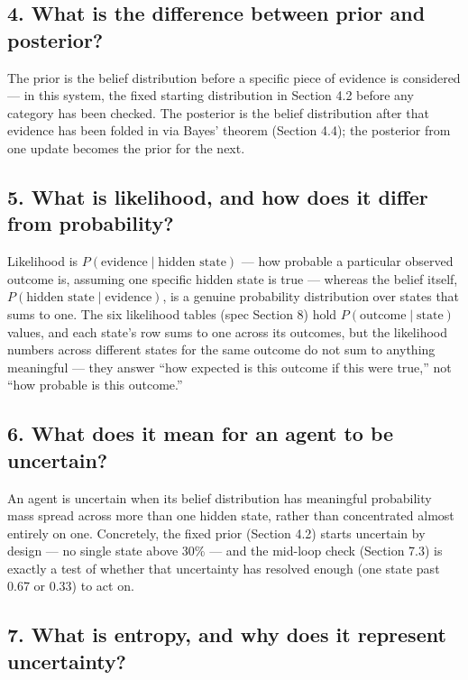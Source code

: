 \documentclass[11pt]{article}
\begin{document}
\subsection*{4. What is the difference between prior and posterior?}

The prior is the belief distribution before a specific piece of evidence is considered --- in this system, the fixed starting distribution in Section 4.2 before any category has been checked. The posterior is the belief distribution after that evidence has been folded in via Bayes' theorem (Section 4.4); the posterior from one update becomes the prior for the next.

\subsection*{5. What is likelihood, and how does it differ from probability?}

Likelihood is $P(\text{evidence}\mid\text{hidden state})$ --- how probable a particular observed outcome is, assuming one specific hidden state is true --- whereas the belief itself, $P(\text{hidden state}\mid\text{evidence})$, is a genuine probability distribution over states that sums to one. The six likelihood tables (spec Section 8) hold $P(\text{outcome}\mid\text{state})$ values, and each state's row sums to one across its outcomes, but the likelihood numbers across different states for the same outcome do not sum to anything meaningful --- they answer ``how expected is this outcome if this were true,'' not ``how probable is this outcome.''

\subsection*{6. What does it mean for an agent to be uncertain?}

An agent is uncertain when its belief distribution has meaningful probability mass spread across more than one hidden state, rather than concentrated almost entirely on one. Concretely, the fixed prior (Section 4.2) starts uncertain by design --- no single state above 30\% --- and the mid-loop check (Section 7.3) is exactly a test of whether that uncertainty has resolved enough (one state past 0.67 or 0.33) to act on.

\subsection*{7. What is entropy, and why does it represent uncertainty?}
\end{document}
